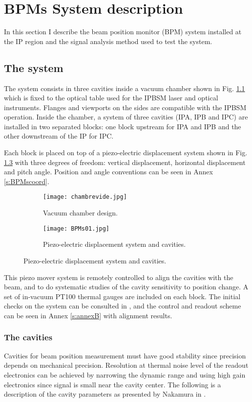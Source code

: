 \chapter{BPMs System description}
In this section I describe the beam position monitor (BPM) system installed at the IP region and the signal analysis method used to test the system.\par
\section{The system}
The system consists in three cavities inside a vacuum chamber shown in Fig. \ref{f:vacuumchamberdes} which is fixed to the optical table used for the IPBSM laser and optical instruments. Flanges and viewports on the sides are compatible with the IPBSM operation. Inside the chamber, a system of three cavities (IPA, IPB and IPC) are installed in two separated blocks: one block upstream for IPA and IPB and the other downstream of the IP for IPC.\par
Each block is placed on top of a piezo-electric displacement system shown in Fig. \ref{f:piezosystem} with three degrees of freedom: vertical displacement, horizontal displacement and pitch angle. Position and angle conventions can be seen in Annex \ref{s:BPMscoord}. \par
\begin{figure}[htb]
\centering
\begin{subfigure}{0.4\textwidth}
 \texttt{[image: chambrevide.jpg]}\caption{Vacuum chamber design.}\label{f:vacuumchamberdes}
\end{subfigure}
\begin{subfigure}{0.5\textwidth}
 \texttt{[image: BPMs01.jpg]}\caption{Piezo-electric displacement system and cavities.}\label{f:piezosystem}
\end{subfigure}
\end{figure}
This piezo mover system is remotely controlled to align the cavities with the beam, and to do systematic studies of the cavity sensitivity to position change. A set of in-vacuum PT100 thermal gauges are included on each block. The initial checks on the system can be consulted in \cite{Bambade2013}, and the control and readout scheme can be seen in Annex \ref{s:annexB} with alignment results.\par
\subsection{The cavities}
Cavities for beam position measurement must have good stability since precision depends on mechanical precision. Resolution at thermal noise level of the readout electronics can be achieved by narrowing the dynamic range and using high gain electronics since signal is small near the cavity center. The following is a description of the cavity parameters as presented by Nakamura in \cite{Nakathese}.\par
